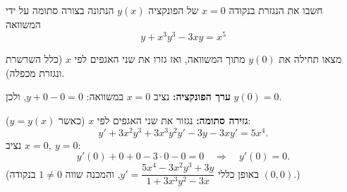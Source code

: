 
\begin{question}
חשבו את הנגזרת בנקודה $x=0$ של הפונקציה $y(x)$ הנתונה בצורה סתומה על ידי המשוואה
\[ y+x^3y^3-3xy=x^5 \]
\end{question}

\begin{hint}
מצאו תחילה את $y(0)$ מתוך המשוואה, ואז גזרו את שני האגפים לפי $x$ (כלל השרשרת ונגזרת מכפלה).
\end{hint}

\begin{solution}
\textbf{ערך הפונקציה:} נציב $x=0$ במשוואה: $y+0-0=0$, ולכן $y(0)=0$.

\textbf{גזירה סתומה:} נגזור את שני האגפים לפי $x$ (כאשר $y=y(x)$):
\[ y'+3x^2y^3+3x^3y^2y'-3y-3xy'=5x^4. \]
נציב $x=0,\ y=0$:
\[ y'(0)+0+0-3\cdot 0-0=0 \quad\Longrightarrow\quad \boxed{y'(0)=0}. \]
(באופן כללי $y'=\dfrac{5x^4-3x^2y^3+3y}{1+3x^3y^2-3x}$, והמכנה שווה $1\neq 0$ בנקודה $(0,0)$.)
\end{solution}
